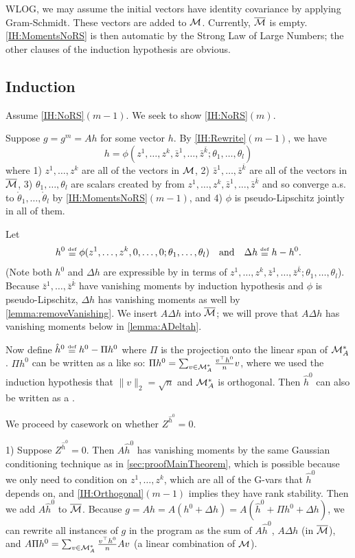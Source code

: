 \documentclass[main.tex]{subfiles}
\begin{document}
WLOG, we may assume the initial vectors have identity covariance by applying Gram-Schmidt. These vectors are added to $\mathcal{M}$. Currently, $\overline{\mathcal{M}}$ is empty. \ref{IH:MomentsNoRS} is then automatic by the Strong Law of Large Numbers; the other clauses of the induction hypothesis are obvious.

\subsection{Induction}

Assume \ref{IH:NoRS}$(m-1)$. We seek to show \ref{IH:NoRS}$(m)$.

Suppose $g=g^{m}=Ah$ for some vector $h$. By \ref{IH:Rewrite}$(m-1)$, we have \[h=\phi(z^{1},\ldots,z^{k},\bar{z}^{1},\ldots,\bar{z}^{\bar{k}};\theta_{1},\ldots,\theta_{l})\] where 1) $z^{1},\ldots,z^{k}$ are all of the vectors in $\mathcal{M}$, 2) $\bar{z}^{1},\ldots,\bar{z}^{\bar{k}}$ are all of the vectors in $\overline{\mathcal{M}}$, 3) $\theta_{1},\ldots,\theta_{l}$ are scalars created by  from $z^{1},\ldots,z^{k},\bar{z}^{1},\ldots,\bar{z}^{\bar{k}}$ and so converge a.s. to $\mathring{\theta}_{1},\ldots,\mathring{\theta}_{l}$ by \ref{IH:MomentsNoRS}$(m-1)$, and 4) $\phi$ is pseudo-Lipschitz jointly in all of them.

Let 
\[h^{0}\defeq\phi(z^{1},\ldots,z^{k},0,\ldots,0;\theta_{1},\ldots,\theta_{l}) \quad\text{and}\quad \Delta h\defeq h-h^{0}.\] (Note both $h^{0}$ and $\Delta h$ are expressible by  in terms of $z^{1},\ldots,z^{k},\bar{z}^{1},\ldots,\bar{z}^{\bar{k}};\theta_{1},\ldots,\theta_{l}$). Because $\bar{z}^{1},\ldots,\bar{z}^{\bar{k}}$ have vanishing moments by induction hypothesis and $\phi$ is pseudo-Lipschitz, $\Delta h$ has vanishing moments as well by \cref{lemma:removeVanishing}. We insert $A\Delta h$ into $\overline{\mathcal{M}}$; we will prove that $A\Delta h$ has vanishing moments below in \cref{lemma:ADeltah}.

Now define $\hat{h}^{0}\defeq h^{0}-\Pi h^{0}$ where $\Pi$ is the projection onto the linear span of $\mathcal{M}_{A}^{*}$. $\Pi h^{0}$ can be written as a  like so: $\Pi h^{0}=\sum_{v\in\mathcal{M}_{A}^{*}}\frac{v^{\top}h^{0}}{n}v$, where we used the induction hypothesis that $\|v\|_{2}=\sqrt{n}$ and $\mathcal{M}_{A}^{*}$ is orthogonal. Then $\hat{h}^{0}$ can also be written as a .

We proceed by casework on whether $Z^{\hat{h}^{0}}=0$.

1) Suppose $Z^{\hat{h}^{0}}=0$. Then $A\hat{h}^{0}$ has vanishing moments by the same Gaussian conditioning technique as in \cref{sec:proofMainTheorem}, which is possible because we only need to condition on $z^{1},\ldots,z^{k}$, which are all of the G-vars that $\hat{h}^{0}$ depends on, and \ref{IH:Orthogonal}$(m-1)$ implies they have rank stability. Then we add $A\hat{h}^{0}$ to $\overline{\mathcal{M}}$. Because $g=Ah=A(h^{0}+\Delta h)=A(\hat{h}^{0}+\Pi h^{0}+\Delta h)$, we can rewrite all instances of $g$ in the program as the sum of $A\hat{h}^{0}$, $A\Delta h$ (in $\overline{\mathcal{M}}$), and $A\Pi h^{0}=\sum_{v\in\mathcal{M}_{A}^{*}}\frac{v^{\top}h^{0}}{n}Av$ (a linear combination of $\mathcal{M}$).
\end{document}
